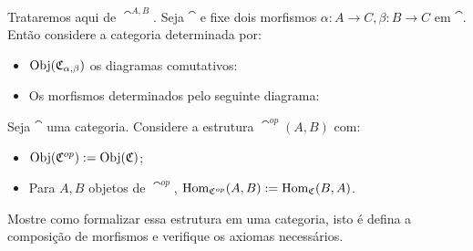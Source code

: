\documentclass[../main]{subfiles}
\begin{document}
    \begin{example}
        Trataremos aqui de \(\cat^{A, B}\). Seja \(\cat\) e fixe dois morfismos
        \(\alpha: A \to C, \beta: B  \to C\) em \(\cat\). Então considere a
        categoria determinada por:
        \begin{itemize}
            \item \(\text{Obj} (\mathfrak{C}_{\alpha, \beta})\) os diagramas comutativos:
            \begin{center}
            \end{center}
            \item Os morfismos determinados pelo seguinte diagrama:
            \begin{center}
            \end{center}
        \end{itemize}
    \end{example}
\begin{exercise}
    Seja \(\cat\) uma categoria. Considere a estrutura \(\cat^{op}(A, B)\) com:
    \begin{itemize}
        \item \(\text{Obj}(\mathfrak{C}^{op}) := \text{Obj}(\mathfrak{C})\);
        \item Para \(A, B\) objetos de \(\cat^{op}\), \(\text{Hom}_{\mathfrak{C}^{op}}(A, B)
        := \text{Hom}_{\mathfrak{C}}(B, A)\).
    \end{itemize}


    Mostre como formalizar essa estrutura em uma categoria, isto é defina a
    composição de morfismos e verifique os axiomas necessários.
\end{exercise}
\end{document}
